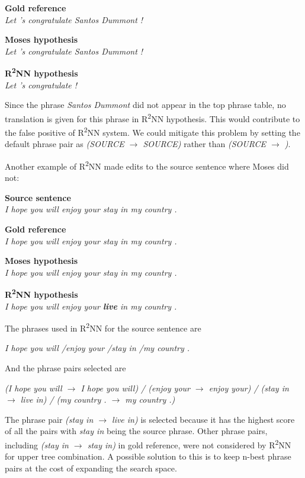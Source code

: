 \documentclass[12pt,a4paper,twoside,openright]{report}
\begin{document}
\textbf{Gold reference}\\
\textit{Let 's congratulate Santos Dummont !}

\textbf{Moses hypothesis}\\
\textit{Let 's congratulate Santos Dummont !}

\textbf{R\textsuperscript{2}NN hypothesis}\\
\textit{Let 's congratulate   !}

Since the phrase \textit{Santos Dummont} did not appear in the top phrase table, no translation is given for this phrase in R\textsuperscript{2}NN hypothesis. This would contribute to the false positive of R\textsuperscript{2}NN system. We could mitigate this problem by setting the default phrase pair as \textit{(SOURCE $\rightarrow$ SOURCE)} rather than \textit{(SOURCE $\rightarrow$ )}.

Another example of R\textsuperscript{2}NN made edits to the source sentence where Moses did not:

\textbf{Source sentence}\\
\textit{I hope you will enjoy your stay in my country .}

\textbf{Gold reference}\\
\textit{I hope you will enjoy your stay in my country .}

\textbf{Moses hypothesis}\\
\textit{I hope you will enjoy your stay in my country .}

\textbf{R\textsuperscript{2}NN hypothesis}\\
\textit{I hope you will enjoy your \textbf{live} in my country .}

The phrases used in R\textsuperscript{2}NN for the source sentence are

\textit{I hope you will /enjoy your /stay in /my country .}

And the phrase pairs selected are

\textit{(I hope you will $\rightarrow$ I hope you will) / 
        (enjoy your $\rightarrow$ enjoy your) / 
        (stay in $\rightarrow$ live in) /  
        (my country . $\rightarrow$ my country .)}

The phrase pair \textit{(stay in $\rightarrow$ live in)} is selected because it has the highest score of all the pairs with \textit{stay in} being the source phrase. Other phrase pairs, including \textit{(stay in $\rightarrow$ stay in)} in gold reference, were not considered by R\textsuperscript{2}NN for upper tree combination. A possible solution to this is to keep n-best phrase pairs at the cost of expanding the search space.
\end{document}
